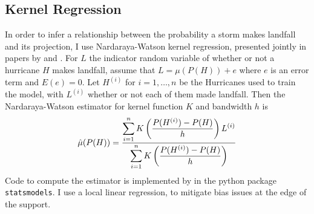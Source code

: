 \subsection{Kernel Regression}
In order to infer a relationship between the probability a storm makes landfall and its projection, I use Nardaraya-Watson kernel regression, presented jointly in papers by \cite{nadaraya1964estimating} and \cite{watson1964smooth}.
For $L$ the indicator random variable of whether or not a hurricane $H$ makes landfall, assume that $L=\mu(P(H))+e$ where $e$ is an error term and $E(e)=0$.
Let $H^{(i)}$ for $i=1,\ldots,n$ be the Hurricanes used to train the model, with $L^{(i)}$ whether or not each of them made landfall.
Then the Nardaraya-Watson estimator for kernel function $K$ and bandwidth $h$ is
\begin{equation}
	\hat\mu(P(H))=\frac{\displaystyle\sum_{i=1}^{n}K\left(\frac{P(H^{(i)})-P(H)}{h}\right)L^{(i)}}{\displaystyle\sum_{i=1}^{n}K\left(\frac{P(H^{(i)})-P(H)}{h}\right)}
	\label{eq:kernel_regression}
\end{equation}
Code to compute the estimator is implemented by \cite{seabold2010statsmodels} in the python package \texttt{statsmodels}.
I use a local linear regression, to mitigate bias issues at the edge of the support.

